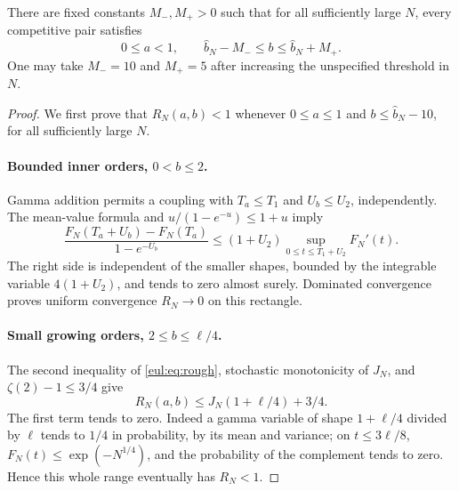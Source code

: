 \begin{lemma}\label{eul:lem:band}
There are fixed constants $M_-,M_+>0$ such that for all sufficiently
large $N$, every competitive pair satisfies
\[
 0\leq a<1,\qquad
 \widehat b_N-M_-\leq b\leq\widehat b_N+M_+.
\]
One may take $M_-=10$ and $M_+=5$ after increasing the unspecified
threshold in $N$.
\end{lemma}
\begin{proof}
We first prove that $R_N(a,b)<1$ whenever $0\leq a\leq1$ and
$b\leq\widehat b_N-10$, for all sufficiently large $N$.

\paragraph{Bounded inner orders, $0<b\leq2$.}
Gamma addition permits a coupling with $T_a\leq T_1$ and
$U_b\leq U_2$, independently.  The mean-value formula and
$u/(1-e^{-u})\leq1+u$ imply
\[
 \frac{F_N(T_a+U_b)-F_N(T_a)}{1-e^{-U_b}}
 \leq(1+U_2)\sup_{0\leq t\leq T_1+U_2}F_N'(t).
\]
The right side is independent of the smaller shapes, bounded by the
integrable variable $4(1+U_2)$, and tends to zero almost surely.
Dominated convergence proves uniform convergence $R_N\to0$ on this
rectangle.

\paragraph{Small growing orders, $2\leq b\leq\ell/4$.}
The second inequality of \eqref{eul:eq:rough}, stochastic monotonicity of
$J_N$, and $\zeta(2)-1\leq3/4$ give
\[
 R_N(a,b)\leq J_N(1+\ell/4)+3/4.
\]
The first term tends to zero.  Indeed a gamma variable of shape
$1+\ell/4$ divided by $\ell$ tends to $1/4$ in probability, by its
mean and variance; on $t\leq3\ell/8$,
$F_N(t)\leq\exp(-N^{1/4})$, and the probability of the complement
tends to zero.  Hence this whole range eventually has $R_N<1$.


\end{proof}
